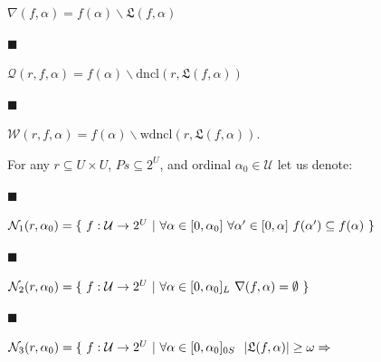 \documentclass[10pt,a4paper]{amsart}
\begin{document}
$\nabla(f,\alpha)=f(\alpha)\backslash\mathfrak{L}(f,\alpha)$\par
 
 
 
\par\noindent  $\blacksquare$ 
 
$\mathcal{Q}(r,f,\alpha)=f(\alpha)\backslash\mathrm{dncl}(r,\mathfrak{L}(f,%
\alpha))$\par
 
 
 
\par\noindent  $\blacksquare$ 
 
$\mathcal{W}(r,f,\alpha)=f(\alpha)\backslash\mathrm{wdncl}(r,\mathfrak{L}(f,%
\alpha))$.\par
 
 
  
 
 
For any $r\subseteq U\times U$, $Ps\subseteq 2^{U}$, and ordinal $\alpha_{0}\in\mathcal{U}$ let us denote:\par
  
\par\noindent  $\blacksquare$ 
 
$\mathcal{N}_{1}(r,\alpha_{0})=\{\leavevmode\nobreak\ f:\mathcal{U}\to 2^{U}%
\leavevmode\nobreak\ |\leavevmode\nobreak\ \forall\alpha\in[0,\alpha_{0}]%
\leavevmode\nobreak\ \forall\alpha^{\prime}\in[0,\alpha]\leavevmode\nobreak\ f%
(\alpha^{\prime})\subseteq f(\alpha)\leavevmode\nobreak\ \}$\par
 
 
 
\par\noindent  $\blacksquare$ 
 
$\mathcal{N}_{2}(r,\alpha_{0})=\{\leavevmode\nobreak\ f:\mathcal{U}\to 2^{U}%
\leavevmode\nobreak\ |\leavevmode\nobreak\ \forall\alpha\in[0,\alpha_{0}]_{L}%
\leavevmode\nobreak\ \nabla(f,\alpha)=\emptyset\leavevmode\nobreak\ \}$\par
 
 
 
\par\noindent  $\blacksquare$ 
 
$\mathcal{N}_{3}(r,\alpha_{0})=\{\leavevmode\nobreak\ f:\mathcal{U}\to 2^{U}%
\leavevmode\nobreak\ |\leavevmode\nobreak\ \forall\alpha\in[0,\alpha_{0}]_{0S}%
\leavevmode\nobreak\ \leavevmode\nobreak\ |\mathfrak{L}(f,\alpha)|\geq\omega\Rightarrow$\par
 
\end{document}
